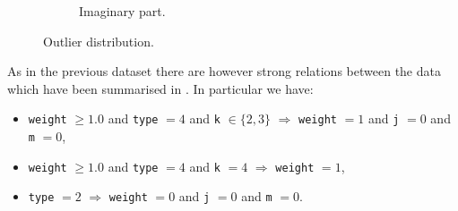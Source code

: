 \begin{figure}[htbp]
\begin{subfigure}{0.45\textwidth}
    \caption{Imaginary part.}
  \end{subfigure}
  \caption{Outlier distribution.}
  \label{fig:wzw:outliers}
\end{figure}

As in the previous dataset there are however strong relations between the data which have been summarised in .
In particular we have:
\begin{itemize}
  \item \texttt{weight} $\ge 1.0$ and \texttt{type} $= 4$ and \texttt{k} $\in \lbrace 2, 3 \rbrace$ $\Rightarrow$ \texttt{weight} $= 1$ and \texttt{j} $= 0$ and \texttt{m} $= 0$,

  \item \texttt{weight} $\ge 1.0$ and \texttt{type} $= 4$ and \texttt{k} $= 4$ $\Rightarrow$ \texttt{weight} $= 1$,

  \item \texttt{type} $= 2$ $\Rightarrow$ \texttt{weight} $= 0$ and \texttt{j} $= 0$ and \texttt{m} $= 0$.
\end{itemize}

